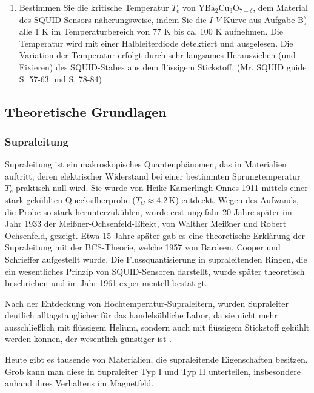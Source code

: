 \documentclass{article}
\begin{document}
\begin{enumerate}
    \item Bestimmen Sie die kritische Temperatur $T_c$ von $\text{YBa}_2\text{Cu}_3\text{O}_{7-\delta}$, dem Material des SQUID-Sensors näherungsweise, indem Sie die $I$-$V$-Kurve aus Aufgabe B) alle 1 K im Temperaturbereich von 77 K bis ca. 100 K aufnehmen. Die Temperatur wird mit einer Halbleiterdiode detektiert und ausgelesen. Die Variation der Temperatur erfolgt durch sehr langsames Herausziehen (und Fixieren) des SQUID-Stabes aus dem flüssigem Stickstoff. (Mr. SQUID guide S. 57-63 und S. 78-84) \cite{mr_squid}
\end{enumerate}







\subsection{Theoretische Grundlagen}

\subsubsection{Supraleitung}

Supraleitung ist ein makroskopisches Quantenphänomen, das in Materialien auftritt, deren elektrischer Widerstand bei einer bestimmten Sprungtemperatur $T_c$ praktisch null wird. Sie wurde von Heike Kamerlingh Onnes 1911 mittels einer stark gekühlten Quecksilberprobe ($T_C \approx 4.2\,\mathrm{K}$) entdeckt. Wegen des Aufwands, die Probe so stark herunterzukühlen, wurde erst ungefähr 20 Jahre später im Jahr 1933 der Meißner-Ochsenfeld-Effekt, von Walther Meißner und Robert Ochsenfeld, gezeigt. Etwa 15 Jahre später gab es eine theoretische Erklärung der Supraleitung mit der BCS-Theorie, welche 1957 von Bardeen, Cooper und Schrieffer aufgestellt wurde. Die Flussquantisierung in supraleitenden Ringen, die ein wesentliches Prinzip von SQUID-Sensoren darstellt, wurde später theoretisch beschrieben und im Jahr 1961 experimentell bestätigt. \cite{mr_squid} \cite{fprak_manual}

Nach der Entdeckung von Hochtemperatur-Supraleitern, wurden Supraleiter deutlich alltagstauglicher für das handelsübliche Labor, da sie nicht mehr ausschließlich mit flüssigem Helium, sondern auch mit flüssigem Stickstoff gekühlt werden können, der wesentlich günstiger ist \cite{liquid_he_na_prices}.

Heute gibt es tausende von Materialien, die supraleitende Eigenschaften besitzen. Grob kann man diese in Supraleiter Typ I und Typ II unterteilen, insbesondere anhand ihres Verhaltens im Magnetfeld.
\end{document}
